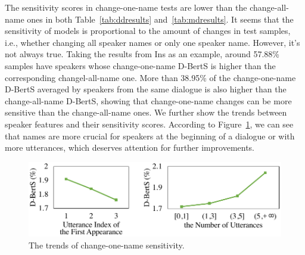 The sensitivity scores in change-one-name tests are lower than the change-all-name ones in both Table~\ref{tab:ddresults} and~\ref{tab:mdresults}. It seems that the sensitivity of models is proportional to the amount of changes in test samples, i.e., whether changing all speaker names or only one speaker name. However,
it's not always true. Taking the results from Ins as an example, around 57.88\% samples have speakers whose change-one-name D-BertS is higher than the corresponding changel-all-name one. More than 38.95\% of the change-one-name D-BertS averaged by speakers from the same dialogue is also higher than the change-all-name D-BertS, showing that change-one-name changes can be more sensitive than the change-all-name ones. We further show the trends between speaker features and their sensitivity scores. According to Figure~\ref{fig:trends}, we can see that names are more crucial for speakers at the beginning of a dialogue or with more utterances, which deserves attention for further improvements. 

\begin{figure}[t]
	\centering
	\includegraphics[scale=0.55]{speaker-sensitivity.pdf}

	\caption{The trends of change-one-name sensitivity.}%
	\label{fig:trends}
\end{figure}


